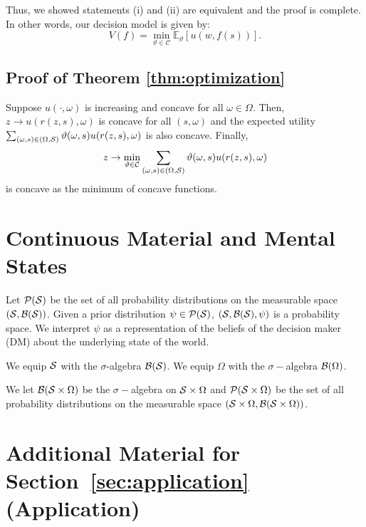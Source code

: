 \documentclass[11pt,oneside]{article}
\theoremstyle{plain}
\theoremstyle{plain}
\theoremstyle{plain}
\theoremstyle{plain}
\theoremstyle{plain}
\theoremstyle{definition}
\theoremstyle{definition}
\theoremstyle{remark}
\theoremstyle{plain}
\def\bbe{{\mathbb{E}}}
\newcommand{\mcs}{{\cal S}}
\begin{document}
Thus, we showed statements (i) and (ii) are equivalent and the proof is complete.
In other words, our decision model is given by:
\[
    V(f) = \min_{\vartheta \in \mathcal{C}} \bbe_\vartheta \left[ u\left(w,f(s)\right) \right].
\]

\subsection{Proof of Theorem \ref{thm:optimization}}

Suppose $u(\cdot, \omega)$ is increasing and concave for all $\omega \in \Omega$. Then, $z \rightarrow u(r(z, s), \omega)$ is concave for all $(s, \omega)$ and the expected utility $\sum_{(\omega,s) \in (\Omega, \mcs)} \vartheta(\omega,s) u(r(z, s), \omega)$ is also concave. Finally,
$$
z \rightarrow \min_{\vartheta \in {\cal C}} \sum_{(\omega,s) \in (\Omega, \mcs)} \vartheta(\omega,s) u(r(z, s), \omega)
$$
is concave as the minimum of concave functions.


\section{Continuous Material and Mental States}
\label{sec:continuous}

Let ${\cal P}(\mcs)$ be the set of all probability distributions on the measurable space $(\mcs , {\cal B}(\mcs))$. Given a prior distribution $\psi \in {\cal P}(\mcs)$, $(\mcs , {\cal B}(\mcs), \psi)$ is a probability space.
We interpret $\psi$ as a representation of the beliefs of the decision maker (DM) about the underlying state of the world.

We equip $\mcs$ with the $\sigma$-algebra $\cal B(\mcs)$.
We equip $\Omega$ with the $\sigma-$algebra ${\cal B}(\Omega)$.

We let ${\cal B}(\mcs \times \Omega)$ be the $\sigma-$algebra on $\mcs \times \Omega$ and ${\cal P}(\mcs \times \Omega)$ be the set of all probability distributions on the measurable space $(\mcs \times \Omega, {\cal B}(\mcs \times \Omega))$.






\section{Additional Material for Section~\ref{sec:application} (Application)}
\end{document}
